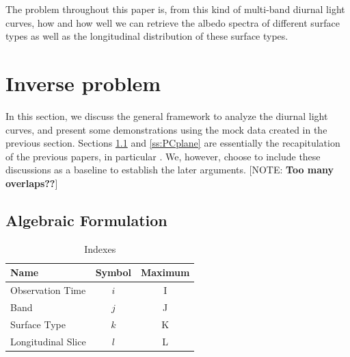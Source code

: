 \documentclass[iop,numberedappendix,apj,]{emulateapj}
\def\memoYF#1{\color{red}[NOTE: {\bf #1}]\color{black}}
\begin{document}
The problem throughout this paper is, from this kind of multi-band diurnal light curves, how and how well we can retrieve the albedo spectra of different surface types as well as the longitudinal distribution of these surface types. 


\section{Inverse problem}
\label{s:frame}

In this section, we discuss the general framework to analyze the diurnal light curves, and present some demonstrations using the mock data created in the previous section. 
Sections \ref{ss:model} and \ref{ss:PCplane} are essentially the recapitulation of the previous papers, in particular \citet{Cowan2013} \citep[but see also][]{Cowan2009,Cowan2011,Fujii2010,Fujii2011}.  
We, however, choose to include these discussions as a baseline to establish the later arguments. 
\memoYF{Too many overlaps??}

\subsection{Algebraic Formulation}
\label{ss:model}


\begin{table}[b]
\caption{Indexes}
\begin{center}
\begin{tabular}{lcc} \hline \hline
Name & Symbol & Maximum \\ \hline
Observation Time & $i$ & I \\
Band & $j$ & J  \\
Surface Type & $k$ & K  \\
Longitudinal Slice  & $l$ & L \\ \hline
\end{tabular}
\end{center}
\label{tab:index}
\end{table}%
\end{document}
